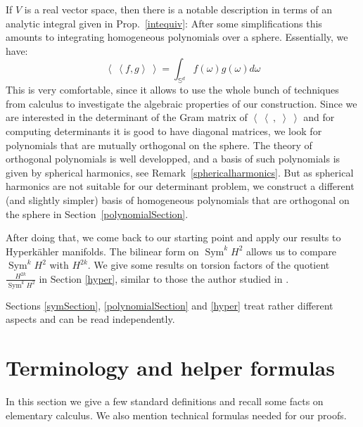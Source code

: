 \documentclass{amsart}
\DeclareMathOperator{\Sym}{Sym}
\newcommand{\bra}{\left<\!\!\!\:\left<}
\newcommand{\ket}{\right>\!\!\!\:\right>}
\renewcommand{\S}{\mathbb{S}}
\theoremstyle{plain}
\theoremstyle{definition}
\theoremstyle{remark}
\begin{document}
If $V$ is a real vector space, then there is a notable description in terms of an analytic integral given in Prop.~\ref{intequiv}: After some simplifications this amounts to integrating homogeneous polynomials over a sphere. Essentially, we have:
$$ \bra f,g\ket = \int_{\S^d} f(\omega)g(\omega)d\omega $$
This is very comfortable, since it allows to use the whole bunch of techniques from calculus to investigate the algebraic properties of our construction.
Since we are interested in the determinant of the Gram matrix of $\bra\ ,\;\ket$
and for computing determinants it is good to have diagonal matrices, we look for polynomials that are mutually orthogonal on the sphere. The theory of orthogonal polynomials is well developped, and a basis of such polynomials is given by spherical harmonics, see Remark~\ref{sphericalharmonics}. But as spherical harmonics are not suitable for our determinant problem, we construct a different (and slightly simpler)
basis of homogeneous polynomials that are orthogonal on the sphere in Section~\ref{polynomialSection}.

After doing that, we come back to our starting point and apply our results to Hyperk\"ahler manifolds. The bilinear form on $\Sym^kH^2$ allows us to compare $\Sym^kH^2$ with $H^{2k}$. We give some results on torsion factors of the quotient $\frac{H^{2k}}{\Sym^kH^2}$ in Section \ref{hyper}, similar to those the author studied in \cite{Kapfer}.

Sections \ref{symSection}, \ref{polynomialSection} and \ref{hyper} treat rather different aspects and can be read independently.



\section{Terminology and helper formulas} \label{boring}
In this section 
we give a few standard definitions and recall some facts on elementary calculus. We also mention technical formulas needed for our proofs.
\end{document}
